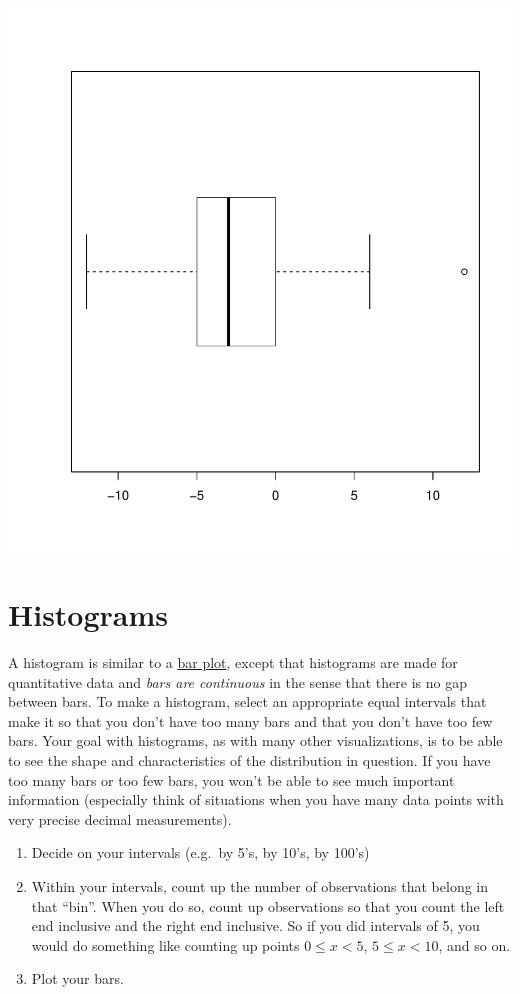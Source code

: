 \documentclass[
]{book}
\theoremstyle{definition}
\theoremstyle{definition}
\theoremstyle{definition}
\theoremstyle{definition}
\theoremstyle{remark}
\begin{document}
\includegraphics{_main_files/figure-latex/unnamed-chunk-26-1.pdf}

\hypertarget{histograms}{%
\section{Histograms}\label{histograms}}

A histogram is similar to a \protect\hyperlink{bar-plots}{bar plot}, except that
histograms are made for quantitative data and \emph{bars are continuous} in
the sense that there is no gap between bars. To make a histogram, select
an appropriate equal intervals that make it so that you don't have too
many bars and that you don't have too few bars. Your goal with
histograms, as with many other visualizations, is to be able to see the
shape and characteristics of the distribution in question. If you have
too many bars or too few bars, you won't be able to see much important
information (especially think of situations when you have many data
points with very precise decimal measurements).

\begin{enumerate}
\def\labelenumi{\arabic{enumi}.}
\item
  Decide on your intervals (e.g.~by 5's, by 10's, by 100's)
\item
  Within your intervals, count up the number of observations that
  belong in that ``bin''. When you do so, count up observations so that
  you count the left end inclusive and the right end inclusive. So if
  you did intervals of 5, you would do something like counting up
  points \(0 \leq x < 5\), \(5 \leq x < 10\), and so on.
\item
  Plot your bars.
\end{enumerate}
\end{document}
